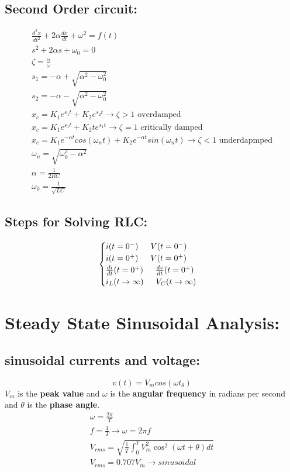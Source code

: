 \documentclass[a4paper,12]{article}
\begin{document}
\subsection{Second Order circuit:}
\begin{gather}
	\frac{d^2x}{dt^2}+2\alpha \frac{dx}{dt}+\omega^2=f(t)\\
	s^2+2\alpha s+\omega_0=0\\
	\zeta =\frac{\alpha}{\omega}\\
	s_1=-\alpha+\sqrt{\alpha^2-\omega_0 ^2}\\
	s_2=-\alpha-\sqrt{\alpha^2-\omega_0 ^2}\\
	x_c=K_1e^{s_1t}+K_2e^{s_2t}\rightarrow \zeta>1\text{ overdamped}\\
	x_c=K_1e^{s_1t}+K_2te^{s_1t}\rightarrow \zeta=1\text{ critically damped}\\
	x_c=K_1e^{-\alpha t}cos(\omega_n t)+K_2e^{-\alpha t}sin(\omega _n t)\rightarrow \zeta<1 \text{ underdapmped}\\
	\omega _n=\sqrt{\omega _0^2-\alpha^2}\\
	\alpha=\frac{1}{2RC}\\
	\omega _0=\frac{1}{\sqrt{LC}}
\end{gather}
\subsection{Steps for Solving RLC:}
\begin{equation}
    \begin{cases}
    i(t=0^-) \indent V(t=0^-)\\
    i(t=0^+) \indent V(t=0^+)\\
     \frac{di}{dt}(t=0^+) \indent \frac{dv}{dt}(t=0^+)\\
     i_L(t\rightarrow \infty) \indent V_C(t \rightarrow \infty)
    \end{cases}
\end{equation}
\clearpage
\section{Steady State Sinusoidal Analysis:}
\subsection{sinusoidal currents and voltage:}

    \[v(t)=V_m cos(\omega t_\theta)\]
    $V_m$ is the \textbf{peak value} and $\omega$ is the \textbf{angular frequency} in radians per second and $\theta$ is the \textbf{phase angle}.\\
    \begin{gather}
       \omega = \frac{2\pi}{T}\\
    f=\frac{1}{T}\rightarrow \omega =2\pi f\\
    V_{rms}=\sqrt{\frac{1}{T}\int_0^T V_m^2\cos^2(\omega t+\theta)dt} \\
    V_{rms}=0.707 V_m\rightarrow sinusoidal
    \end{gather}
\end{document}
